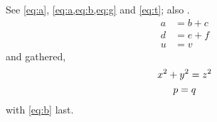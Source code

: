 \documentclass{article}
\begin{document}
See \cref{eq:a}, \cref{eq:a,eq:b,eq:g} and \cref{eq:t}; also .
\begin{align}
a &= b + c \label{eq:a} \\
d &= e + f \tag{T} \label{eq:t} \\
u &= v \label{eq:b}
\end{align}
and gathered,
\begin{gather}
x^2 + y^2 = z^2 \label{eq:g} \\
p = q \notag
\end{gather}
with \cref{eq:b} last.
\end{document}
